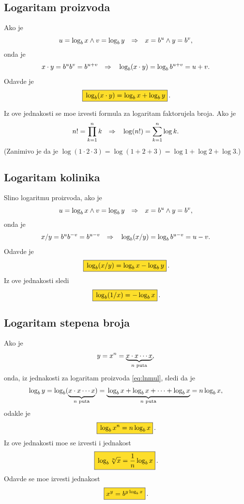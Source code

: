 \documentclass[12pt, twoside, a4paper]{article}
\def\logb{\log_b}
\begin{document}
\subsection{Logaritam proizvoda}

Ako je
$$
u=\logb x\land v=\log_b y \sledi x=b^u\land y=b^v,
$$
onda je
$$
x\cdot y=b^ub^v=b^{u+v}\sledi \logb(x\cdot y)=\logb b^{u+v}=u+v.
$$
Odavde je
\begin{equation}
\okvir{\logb(x\cdot y)=\logb x+\logb y}.
\label{eq:lnmul}
\end{equation}

Iz ove jednakosti se mo{\zv}e izvesti formula za logaritam faktorujela broja. Ako je
$$
n!=\prod_{k=1}^n k{\quad\Rightarrow\quad} \log(n!)=\sum_{k=1}^n\log k.
$$
(Zanim{\lj}ivo je da je $\log(1\cdot2\cdot3)=\log(1+2+3)=\log1+\log2+\log3$.)


\subsection{Logaritam koli{\cv}nika}

Sli{\cv}no logaritmu proizvoda, 
ako je
$$
u=\logb x\land v=\log_b y \sledi x=b^u\land y=b^v,
$$
onda je
$$
x/ y=b^ub^{-v}=b^{u-v}\sledi \logb(x/y)=\logb b^{u-v}=u-v.
$$
Odavde je
\begin{equation}
\okvir{\logb(x/ y)=\logb x-\logb y}.
\label{eq:lndiv}
\end{equation}
Iz ove jednakosti sledi
\begin{equation}
\okvir{\logb(1/x)=-\logb x}.
\label{eq:recip}
\end{equation}

\subsection{Logaritam stepena broja}

Ako je
$$
y=x^n=\underbrace{x\cdot x\cdots x}_{\text{$\mathstrut n$ puta}},
$$
onda, iz jednakosti za logaritam proizvoda \eqref{eq:lnmul}, sledi da je
$$
\logb y=\logb (\underbrace{\mathstrut x\cdot x\cdots x}_{\text{$n$ puta}})
=\underbrace{\mathstrut \logb x+\logb x+\cdots+\logb x}_{\text{$n$ puta}}
=n\logb x,
$$
odakle je
\begin{equation}
\okvir{\logb x^n=n\logb x}.
\label{eq:bpow}
\end{equation}
Iz ove jednakosti mo{\zv}e se izvesti i jednakost
\begin{equation}
\okvir{\logb\sqrt[n] x={1\over n}\logb x}.
\label{eq:lnroot}
\end{equation}
Odavde se mo{\zv}e izvesti jednakost
\begin{equation}
\okvir{x^y=b^{y\logb x}}.
\label{eq:power}
\end{equation}
\end{document}
